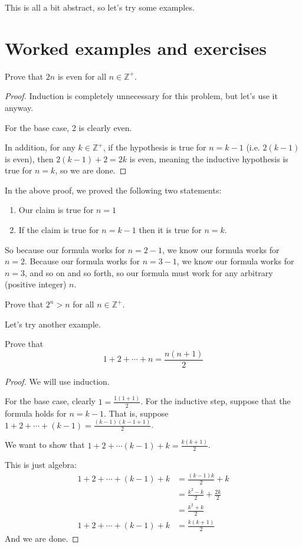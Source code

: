 \documentclass[a4paper]{scrartcl}
\begin{document}
\vspace{12pt}

This is all a bit abstract, so let's try some examples.

\section{Worked examples and exercises}

\begin{example}
	Prove that $2n$ is even for all $n \in \mathbb{Z}^+$.
\end{example}
\begin{proof}
	Induction is completely unnecessary for this problem, but let's use it anyway.

	For the base case, 2 is clearly even. 

	In addition, for any $k \in \mathbb{Z}^+$, if the hypothesis is true for $n=k-1$ (i.e. $2(k-1)$ is even), then $2(k-1)+2 = 2k$ is even, meaning the inductive hypothesis is true for $n=k$, so we are done.
\end{proof}


In the above proof, we proved the following two statements:
\begin{enumerate}
	\item Our claim is true for $n=1$
	\item If the claim is true for $n=k-1$ then it is true for $n=k$.
\end{enumerate}
		So because our formula works for $n=2-1$, we know our formula works for $n=2$. Because our formula works for $n=3-1$, we know our formula works for $n=3$, and so on and so forth, so our formula must work for any arbitrary (positive integer) $n$.

\begin{exercise}
	Prove that $2^n > n$ for all $n \in \mathbb{Z}^+$.
\end{exercise}

Let's try another example.

\begin{example}
	Prove that
	\[1 + 2 + \cdots + n = \frac{n\left(n+1\right)}{2}\]
\end{example}
\begin{proof}
	We will use induction.

	For the base case, clearly $1 = \frac{1(1+1)}{2}$.
	For the inductive step, suppose that the formula holds for $n=k-1$. That is, suppose $1 + 2 + \cdots + \left(k-1\right) = \frac{(k-1)(k-1+1)}{2}$.
	
	We want to show that $1 + 2 + \cdots \left(k-1\right) + k = \frac{k(k+1)}{2}$.

	This is just algebra:
	\begin{align*}
		1 + 2 + \cdots + \left(k-1\right) + k &= \frac{(k-1)k}{2} + k \\
					 &= \frac{k^2 - k}{2} + \frac{2k}{2} \\
					 &= \frac{k^2 + k}{2} \\
		1 + 2 + \cdots + \left(k-1\right) + k &= \frac{k(k+1)}{2}
	\end{align*}
	And we are done.
\end{proof}
\end{document}
